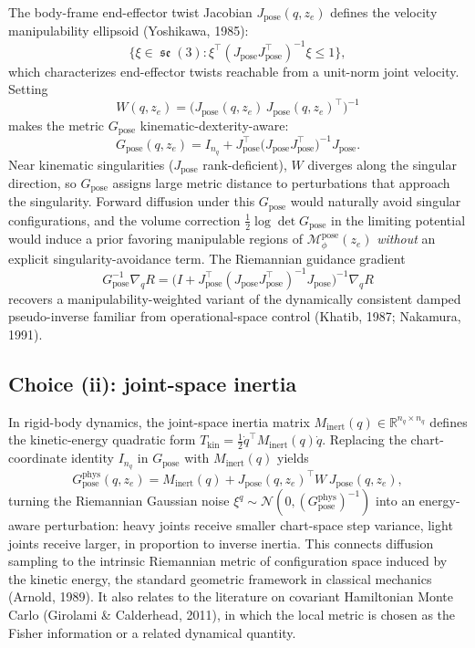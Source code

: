 \documentclass[11pt,a4paper]{article}
\DeclareMathOperator{\se}{\mathfrak{se}}
\newcommand{\R}{\mathbb{R}}
\newcommand{\N}{\mathcal{N}}
\newcommand{\Mpose}{\mathcal{M}_\phi^{\text{pose}}}
\newcommand{\Jpose}{J_{\text{pose}}}
\begin{document}
The body-frame end-effector twist Jacobian $\Jpose(q, z_e)$ defines the velocity manipulability ellipsoid (Yoshikawa, 1985):
\begin{equation}
\bigl\{ \xi \in \se(3) : \xi^\top (\Jpose \Jpose^\top)^{-1} \xi \leq 1 \bigr\},
\end{equation}
which characterizes end-effector twists reachable from a unit-norm joint velocity. Setting
\begin{equation}
W(q, z_e) = \bigl( \Jpose(q, z_e) \, \Jpose(q, z_e)^\top \bigr)^{-1}
\end{equation}
makes the metric $G_{\text{pose}}$ kinematic-dexterity-aware:
\begin{equation}
G_{\text{pose}}(q, z_e) = I_{n_q} + \Jpose^\top \bigl( \Jpose \Jpose^\top \bigr)^{-1} \Jpose.
\end{equation}
Near kinematic singularities ($\Jpose$ rank-deficient), $W$ diverges along the singular direction, so $G_{\text{pose}}$ assigns large metric distance to perturbations that approach the singularity. Forward diffusion under this $G_{\text{pose}}$ would naturally avoid singular configurations, and the volume correction $\tfrac{1}{2}\log\det G_{\text{pose}}$ in the limiting potential would induce a prior favoring manipulable regions of $\Mpose(z_e)$ \emph{without} an explicit singularity-avoidance term. The Riemannian guidance gradient
\begin{equation}
G_{\text{pose}}^{-1} \nabla_q R = \bigl( I + \Jpose^\top (\Jpose \Jpose^\top)^{-1} \Jpose \bigr)^{-1} \nabla_q R
\end{equation}
recovers a manipulability-weighted variant of the dynamically consistent damped pseudo-inverse familiar from operational-space control (Khatib, 1987; Nakamura, 1991).

\subsection{Choice (ii): joint-space inertia}

In rigid-body dynamics, the joint-space inertia matrix $M_\text{inert}(q) \in \R^{n_q \times n_q}$ defines the kinetic-energy quadratic form $T_{\text{kin}} = \tfrac{1}{2} \dot q^\top M_\text{inert}(q) \dot q$. Replacing the chart-coordinate identity $I_{n_q}$ in $G_{\text{pose}}$ with $M_\text{inert}(q)$ yields
\begin{equation}
G_{\text{pose}}^{\text{phys}}(q, z_e) = M_\text{inert}(q) + \Jpose(q, z_e)^\top W \, \Jpose(q, z_e),
\end{equation}
turning the Riemannian Gaussian noise $\xi^q \sim \N(0, (G_{\text{pose}}^{\text{phys}})^{-1})$ into an energy-aware perturbation: heavy joints receive smaller chart-space step variance, light joints receive larger, in proportion to inverse inertia. This connects diffusion sampling to the intrinsic Riemannian metric of configuration space induced by the kinetic energy, the standard geometric framework in classical mechanics (Arnold, 1989). It also relates to the literature on covariant Hamiltonian Monte Carlo (Girolami \& Calderhead, 2011), in which the local metric is chosen as the Fisher information or a related dynamical quantity.
\end{document}
